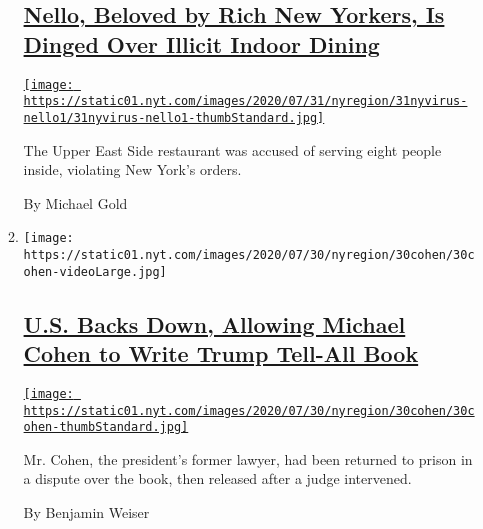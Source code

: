 \begin{enumerate}
\begin{enumerate}
    \hypertarget{nello-beloved-by-rich-new-yorkers-is-dinged-over-illicit-indoor-dining}{%
    \subsection{\texorpdfstring{\href{/2020/07/31/nyregion/nello-liquor-license-suspended.html}{Nello,
    Beloved by Rich New Yorkers, Is Dinged Over Illicit Indoor
    Dining}}{Nello, Beloved by Rich New Yorkers, Is Dinged Over Illicit Indoor Dining}}\label{nello-beloved-by-rich-new-yorkers-is-dinged-over-illicit-indoor-dining}}

    \href{/2020/07/31/nyregion/nello-liquor-license-suspended.html}{\texttt{[image: https://static01.nyt.com/images/2020/07/31/nyregion/31nyvirus-nello1/31nyvirus-nello1-thumbStandard.jpg]}}

    The Upper East Side restaurant was accused of serving eight people
    inside, violating New York's orders.

    By Michael Gold
  \item
    \texttt{[image: https://static01.nyt.com/images/2020/07/30/nyregion/30cohen/30cohen-videoLarge.jpg]}

    \hypertarget{us-backs-down-allowing-michael-cohen-to-write-trump-tell-all-book}{%
    \subsection{\texorpdfstring{\href{/2020/07/30/nyregion/michael-cohen-donald-trump-book.html}{U.S.
    Backs Down, Allowing Michael Cohen to Write Trump Tell-All
    Book}}{U.S. Backs Down, Allowing Michael Cohen to Write Trump Tell-All Book}}\label{us-backs-down-allowing-michael-cohen-to-write-trump-tell-all-book}}

    \href{/2020/07/30/nyregion/michael-cohen-donald-trump-book.html}{\texttt{[image: https://static01.nyt.com/images/2020/07/30/nyregion/30cohen/30cohen-thumbStandard.jpg]}}

    Mr. Cohen, the president's former lawyer, had been returned to
    prison in a dispute over the book, then released after a judge
    intervened.

    By Benjamin Weiser
  \end{enumerate}
\end{enumerate}

